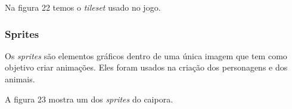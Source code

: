 Na figura 22 temos o \textit{tileset} usado no jogo.
\begin{figure}[h!]
		\centering
	\end{figure}

\subsubsection{Sprites}
Os \textit{sprites} são elementos gráficos dentro de uma única imagem que tem como objetivo criar animações. Eles foram usados na criação dos personagens e dos animais. 

A figura 23 mostra um dos \textit{sprites} do caipora.

\begin{figure}[h!]
		\centering
	\end{figure}


